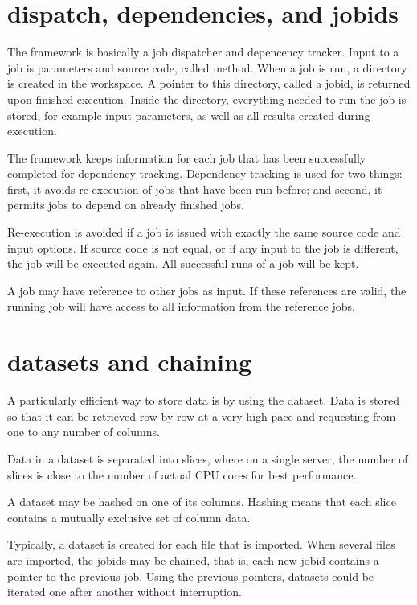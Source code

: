 \section{dispatch, dependencies, and jobids}
The framework is basically a job dispatcher and depencency tracker.
Input to a job is parameters and source code, called method.  When a
job is run, a directory is created in the workspace.  A pointer to
this directory, called a jobid, is returned upon finished execution.
Inside the directory, everything needed to run the job is stored, for
example input parameters, as well as all results created during
execution.

The framework keeps information for each job that has been
successfully completed for dependency tracking.  Dependency tracking
is used for two things: first, it avoids re-execution of jobs that
have been run before; and second, it permits jobs to depend on already
finished jobs.

Re-execution is avoided if a job is issued with exactly the same
source code and input options.  If source code is not equal, or if any
input to the job is different, the job will be executed again.  All
successful runs of a job will be kept.

A job may have reference to other jobs as input.  If these references
are valid, the running job will have access to all information from
the reference jobs.



\section{datasets and chaining}
A particularly efficient way to store data is by using the dataset.
Data is stored so that it can be retrieved row by row at a very high
pace and requesting from one to any number of columns.

Data in a dataset is separated into slices, where on a single server,
the number of slices is close to the number of actual CPU cores for
best performance.

A dataset may be hashed on one of its columns.  Hashing means that
each slice contains a mutually exclusive set of column data.

Typically, a dataset is created for each file that is imported.  When
several files are imported, the jobids may be chained, that is, each
new jobid contains a pointer to the previous job.  Using the
previous-pointers, datasets could be iterated one after another
without interruption.



